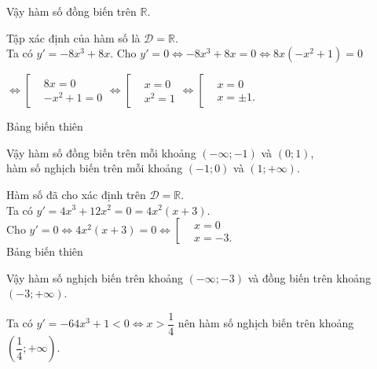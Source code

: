 \begin{vd}
{\begin{enumEX}[a)]{1}
\begin{center}
\begin{tikzpicture}
			\end{tikzpicture}
		\end{center}
		Vậy hàm số đồng biến trên $\mathbb{R}$.
		\item Tập xác định của hàm số là $ \mathscr{D}=\mathbb{R}$.\\
		Ta có $y'=-8x^3+8x$.
		Cho $y'=0 \Leftrightarrow -8x^3+8x=0 \Leftrightarrow 8x(-x^2+1)=0$\\
		\centerline{$ \Leftrightarrow \left[\begin{aligned}
				&8x=0 \\
				&-x^2+1=0
			\end{aligned}\right. \Leftrightarrow \left[\begin{aligned}
				&x=0 \\
				&x^2=1
			\end{aligned}\right. \Leftrightarrow \left[\begin{aligned}
				&x=0 \\
				&x=\pm 1.
			\end{aligned}\right. $}
		Bảng biến thiên
		\begin{center}
		\end{center}
		Vậy hàm số đồng biến trên mỗi khoảng $(-\infty;-1)$ và $(0;1)$,\\
		\indent{ } hàm số nghịch biến trên mỗi khoảng $(-1;0)$ và $(1;+\infty)$.
		\item Hàm số đã cho xác định trên $\mathscr{D}=\mathbb{R}$.\\
		Ta có $y'=4x^3+12x^2=0=4x^2(x+3)$.\\
		Cho $y'=0 \Leftrightarrow 4x^2(x+3)=0 \Leftrightarrow \left[\begin{aligned}
			&x=0 \\
			&x=-3.
		\end{aligned}\right.$\\
		Bảng biến thiên
		\begin{center}
		\end{center}
		Vậy hàm số nghịch biến trên khoảng $(-\infty;-3)$ và đồng biến trên khoảng $(-3;+\infty)$.
		\item Ta có $y'=-64x^3+1<0\Leftrightarrow x>\dfrac{1}{4}$ nên hàm số nghịch biến trên khoảng $\left(\dfrac{1}{4};+\infty\right)$.
\end{enumEX}}
\end{vd}

